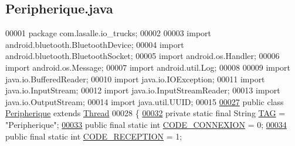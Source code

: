 \hypertarget{_peripherique_8java_source}{}\subsection{Peripherique.\+java}
\label{_peripherique_8java_source}

\begin{DoxyCode}
00001 \textcolor{keyword}{package }com.lasalle.io\_trucks;
00002 
00003 \textcolor{keyword}{import} android.bluetooth.BluetoothDevice;
00004 \textcolor{keyword}{import} android.bluetooth.BluetoothSocket;
00005 \textcolor{keyword}{import} android.os.Handler;
00006 \textcolor{keyword}{import} android.os.Message;
00007 \textcolor{keyword}{import} android.util.Log;
00008 
00009 \textcolor{keyword}{import} java.io.BufferedReader;
00010 \textcolor{keyword}{import} java.io.IOException;
00011 \textcolor{keyword}{import} java.io.InputStream;
00012 \textcolor{keyword}{import} java.io.InputStreamReader;
00013 \textcolor{keyword}{import} java.io.OutputStream;
00014 \textcolor{keyword}{import} java.util.UUID;
00015 
\hyperlink{classcom_1_1lasalle_1_1io__trucks_1_1_peripherique}{00027} \textcolor{keyword}{public} \textcolor{keyword}{class }\hyperlink{classcom_1_1lasalle_1_1io__trucks_1_1_peripherique}{Peripherique} \textcolor{keyword}{extends} \hyperlink{class_thread}{Thread}
00028 \{
\hyperlink{classcom_1_1lasalle_1_1io__trucks_1_1_peripherique_a9ad17604c5e0a0ca93908a76af9db6cc}{00032}     \textcolor{keyword}{private} \textcolor{keyword}{static} \textcolor{keyword}{final} String \hyperlink{classcom_1_1lasalle_1_1io__trucks_1_1_peripherique_a9ad17604c5e0a0ca93908a76af9db6cc}{TAG} = \textcolor{stringliteral}{"Peripherique"};
\hyperlink{classcom_1_1lasalle_1_1io__trucks_1_1_peripherique_a46ce17bdb3396e4aee94ea06a0bd8556}{00033}     \textcolor{keyword}{public} \textcolor{keyword}{final} \textcolor{keyword}{static} \textcolor{keywordtype}{int} \hyperlink{classcom_1_1lasalle_1_1io__trucks_1_1_peripherique_a46ce17bdb3396e4aee94ea06a0bd8556}{CODE\_CONNEXION} = 0;
\hyperlink{classcom_1_1lasalle_1_1io__trucks_1_1_peripherique_a2abb4880d1dd4140379b3ff71cff8cf3}{00034}     \textcolor{keyword}{public} \textcolor{keyword}{final} \textcolor{keyword}{static} \textcolor{keywordtype}{int} \hyperlink{classcom_1_1lasalle_1_1io__trucks_1_1_peripherique_a2abb4880d1dd4140379b3ff71cff8cf3}{CODE\_RECEPTION} = 1;

\end{DoxyCode}
